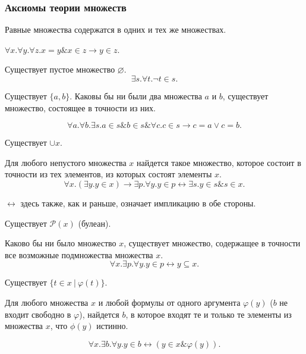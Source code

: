 \subsubsection{Аксиомы теории множеств}
\begin{definition}
    Равные множества содержатся в одних и тех же множествах.

   $\forall x. \forall y. \forall z. x = y \& x \in z \rightarrow y \in z$.
\end{definition}


\begin{definition}  Существует пустое множество $\varnothing$.
   \[\exists s.\forall t.\neg t \in s.\]
\end{definition}

\begin{definition}
    Существует $\{a,b\}$.
Каковы бы ни были два множества $a$ и $b$, существует множество, состоящее в точности из них.

\[ \forall a.\forall b.\exists s.a \in s \& b \in s \& \forall c.c \in s \rightarrow c = a \vee c = b.\]
\end{definition}

\begin{definition} 
   Существует $\cup x$.

   Для любого непустого множества $x$ найдется такое множество, которое состоит в точности из тех элементов, из которых состоят элементы $x$.
\[ \forall x.(\exists y.y \in x) \rightarrow \exists p.\forall y.y \in p \leftrightarrow \exists s.y \in s \& s \in x.\]
\end{definition}
\begin{note}
   $\leftrightarrow$ здесь также, как и раньше, означает импликацию в обе стороны.
\end{note}

\begin{definition} 
   Существует $\mathcal{P}(x)$ (булеан).

   Каково бы ни было множество $x$, существует множество, содержащее в точности все возможные подмножества множества $x$.
\[ \forall x.\exists p.\forall y.y \in p \leftrightarrow y \subseteq x.\]
\end{definition}

\begin{definition} 
   Существует $\{ t \in x\ |\ \varphi(t)\}$.

   Для любого множества $x$ и любой формулы от одного аргумента $\varphi(y)$
($b$ не входит свободно в $\varphi$), найдется $b$, в которое
входят те и только те элементы из множества $x$, что $\phi(y)$ истинно.

\[ \forall x.\exists b.\forall y.y \in b \leftrightarrow (y \in x \& \varphi(y)).\]
\end{definition}

